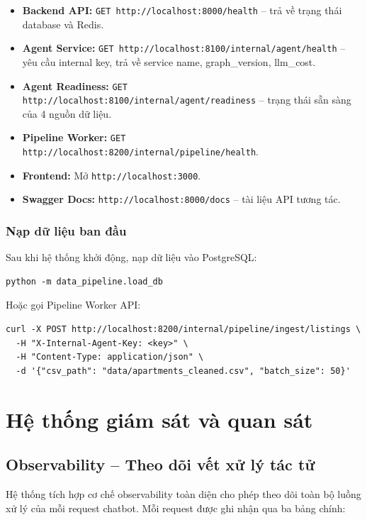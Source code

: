 \begin{itemize}
    \item \textbf{Backend API:} \texttt{GET http://localhost:8000/health} -- trả về trạng thái database và Redis.
    \item \textbf{Agent Service:} \texttt{GET http://localhost:8100/internal/agent/health} -- yêu cầu internal key, trả về service name, graph\_version, llm\_cost.
    \item \textbf{Agent Readiness:} \texttt{GET http://localhost:8100/internal/agent/readiness} -- trạng thái sẵn sàng của 4 nguồn dữ liệu.
    \item \textbf{Pipeline Worker:} \texttt{GET http://localhost:8200/internal/pipeline/health}.
    \item \textbf{Frontend:} Mở \texttt{http://localhost:3000}.
    \item \textbf{Swagger Docs:} \texttt{http://localhost:8000/docs} -- tài liệu API tương tác.
\end{itemize}

\subsubsection{Nạp dữ liệu ban đầu}

Sau khi hệ thống khởi động, nạp dữ liệu vào PostgreSQL:

\begin{verbatim}
python -m data_pipeline.load_db
\end{verbatim}

Hoặc gọi Pipeline Worker API:

\begin{verbatim}
curl -X POST http://localhost:8200/internal/pipeline/ingest/listings \
  -H "X-Internal-Agent-Key: <key>" \
  -H "Content-Type: application/json" \
  -d '{"csv_path": "data/apartments_cleaned.csv", "batch_size": 50}'
\end{verbatim}

\section{Hệ thống giám sát và quan sát}

\subsection{Observability -- Theo dõi vết xử lý tác tử}

Hệ thống tích hợp cơ chế observability toàn diện cho phép theo dõi toàn bộ luồng xử lý của mỗi request chatbot. Mỗi request được ghi nhận qua ba bảng chính:

